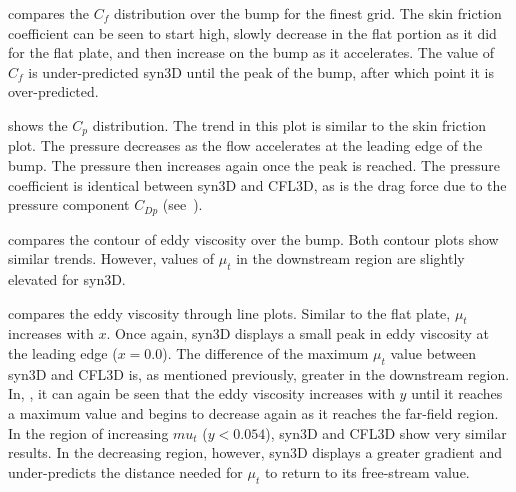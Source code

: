  compares the $C_f$ distribution over the bump for the finest grid. The skin friction coefficient can be seen to start high, slowly decrease in the flat portion as it did for the flat plate, and then increase on the bump as it accelerates. The value of $C_f$ is under-predicted syn3D until the peak of the bump, after which point it is over-predicted.

 shows the $C_p$ distribution. The trend in this plot is similar to the skin friction plot. The pressure decreases as the flow accelerates at the leading edge of the bump. The pressure then increases again once the peak is reached. The pressure coefficient is identical between syn3D and CFL3D, as is the drag force due to the pressure component $C_{Dp}$ (see~).

 compares the contour of eddy viscosity over the bump. Both contour plots show similar trends. However, values of $\mu_t$ in the downstream region are slightly elevated for syn3D.

 compares the eddy viscosity through line plots. Similar to the flat plate, $\mu_t$ increases with $x$. Once again, syn3D displays a small peak in eddy viscosity at the leading edge ($x=0.0$). The difference of the maximum $\mu_t$ value between syn3D and CFL3D is, as mentioned previously, greater in the downstream region. In, , it can again be seen that the eddy viscosity increases with $y$ until it reaches a maximum value and begins to decrease again as it reaches the far-field region. In the region of increasing $mu_t$ ($y < 0.054$), syn3D and CFL3D show very similar results. In the decreasing region, however, syn3D displays a greater gradient and under-predicts the distance needed for $\mu_t$ to return to its free-stream value.


